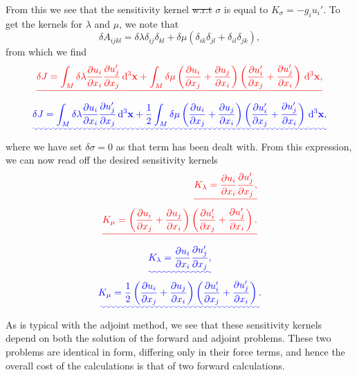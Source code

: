 \documentclass[a4paper,10pt]{paper}
\providecommand{\DIFadd}[1]{{\protect\color{blue}\uwave{#1}}} %
\providecommand{\DIFdel}[1]{{\protect\color{red}\sout{#1}}}                      %
\providecommand{\DIFaddbegin}{} %
\providecommand{\DIFaddend}{} %
\providecommand{\DIFdelbegin}{} %
\providecommand{\DIFdelend}{} %
\begin{document}
\begin{enumerate}
\begin{equation*}
\end{equation*}
From this we see that the sensitivity kernel \DIFdelbegin \DIFdel{w.r.t }\DIFdelend \DIFaddbegin \DIFadd{with respect to }\DIFaddend $\sigma$ is equal to $K_{\sigma}=-g_{i}u_{i}'$. To get the kernels for $\lambda$ and $\mu$, we note that
\begin{equation*}
    \delta A_{ijkl}=\delta\lambda\delta_{ij}\delta_{kl}+\delta\mu(\delta_{ik}\delta_{jl}+\delta_{il}\delta_{jk}),
\end{equation*}
from which we find
\DIFdelbegin \begin{displaymath}
    \DIFdel{\delta J=\int_{M}\delta\lambda\frac{\partial u_{i}}{\partial x_{i}}\frac{\partial u_{j}'}{\partial x_{j}}\dd^{3}\mathbf{x}+\int_{M}\delta\mu\left(\frac{\partial u_{i}}{\partial x_{j}}+\frac{\partial u_{j}}{\partial x_{i}}\right)\left(\frac{\partial u_{i}'}{\partial x_{j}}+\frac{\partial u_{j}'}{\partial x_{i}}\right)\dd^{3}\mathbf{x},
}\end{displaymath}%
\DIFdelend \DIFaddbegin \begin{equation*}
    \DIFadd{\delta J=\int_{M}\delta\lambda\frac{\partial u_{i}}{\partial x_{i}}\frac{\partial u_{j}'}{\partial x_{j}}\dd^{3}\mathbf{x}+\frac{1}{2}\int_{M}\delta\mu\left(\frac{\partial u_{i}}{\partial x_{j}}+\frac{\partial u_{j}}{\partial x_{i}}\right)\left(\frac{\partial u_{i}'}{\partial x_{j}}+\frac{\partial u_{j}'}{\partial x_{i}}\right)\dd^{3}\mathbf{x},
}\end{equation*}\DIFaddend 
where we have set $\delta\sigma=0$ as that term has been dealt with. From this expression, we can now read off the desired sensitivity kernels
\DIFdelbegin \begin{eqnarray*}
    \DIFdel{K_{\lambda}=\frac{\partial u_{i}}{\partial x_{i}}\frac{\partial u_{j}'}{\partial x_{j}}, }\\
    \DIFdel{K_{\mu}=\left(\frac{\partial u_{i}}{\partial x_{j}}+\frac{\partial u_{j}}{\partial x_{i}}\right)\left(\frac{\partial u_{i}'}{\partial x_{j}}+\frac{\partial u_{j}'}{\partial x_{i}}\right).
}\end{eqnarray*}%
\DIFdelend \DIFaddbegin \begin{gather*}
    \DIFadd{K_{\lambda}=\frac{\partial u_{i}}{\partial x_{i}}\frac{\partial u_{j}'}{\partial x_{j}}, }\\
    \DIFadd{K_{\mu}=\frac{1}{2}\left(\frac{\partial u_{i}}{\partial x_{j}}+\frac{\partial u_{j}}{\partial x_{i}}\right)\left(\frac{\partial u_{i}'}{\partial x_{j}}+\frac{\partial u_{j}'}{\partial x_{i}}\right).
}\end{gather*}\DIFaddend 
As is typical with the adjoint method, we see that these sensitivity kernels depend on both the solution of the forward and adjoint problems. These two problems are identical in form, differing only in their force terms, and hence the overall cost of the calculations is that of two forward calculations.




\end{enumerate}
\end{document}
